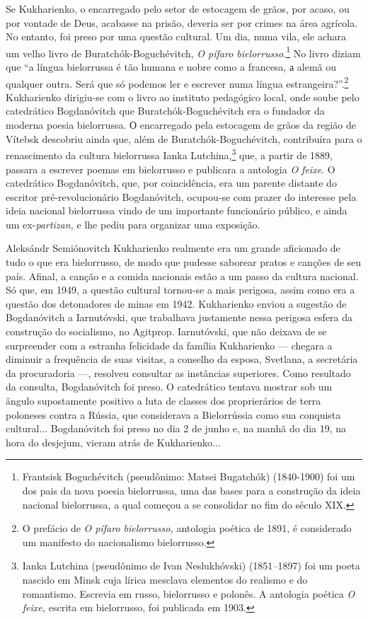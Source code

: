 Se Kukharienko, o encarregado pelo setor de estocagem de grãos, por
acaso, ou por vontade de Deus, acabasse na prisão, deveria ser por
crimes na área agrícola. No entanto, foi preso por uma questão cultural.
Um dia, numa vila, ele achara um velho livro de Buratchók-Boguchévitch,
\emph{O pífaro bielorrusso}.\footnote{Frantsisk Boguchévitch
  (pseudônimo: Matsei Bugatchók) (1840-1900) foi um dos pais da nova
  poesia bielorrussa, uma das bases para a construção da ideia nacional
  bielorrussa, a qual começou a se consolidar no fim do século XIX.} No
livro diziam que ``a língua bielorrussa é tão humana e nobre como a
francesa, а alemã ou qualquer outra. Será que só podemos ler e escrever
numa língua estrangeira?''.\footnote{O prefácio de \emph{O pífaro
  bielorrusso,} antologia poética de 1891, é considerado um manifesto do
  nacionalismo bielorrusso.} Kukharienko dirigiu-se com o livro ao
instituto pedagógico local, onde soube pelo catedrático Bogdanóvitch que
Buratchók-Boguchévitch era o fundador da moderna poesia bielorrussa. О
encarregado pela estocagem de grãos da região de Vítebsk descobriu ainda
que, além de Buratchók-Boguchévitch, contribuíra para o renascimento da
cultura bielorrussa Ianka Lutchina,\footnote{Ianka Lutchina (pseudônimo
  de Ivan Neslukhóvski) (1851\emph{--}1897) foi um poeta nascido em
  Minsk cuja lírica mesclava elementos do realismo e do romantismo.
  Escrevia em russo, bielorrusso e polonês. A antologia poética \emph{O
  feixe,} escrita em bielorrusso, foi publicada em 1903.} que, a partir
de 1889, passara a escrever poemas em bielorrusso e publicara a
antologia \emph{O feixe}. O catedrático Bogdanóvitch, que, por
coincidência, era um parente distante do escritor pré-revolucionário
Bogdanóvitch, ocupou-se com prazer do interesse pela ideia nacional
bielorrussa vindo de um importante funcionário público, e ainda um
ex-\emph{partizan,} e lhe pediu para organizar uma exposição.

Aleksándr Semiónovitch Kukharienko realmente era um grande aficionado de
tudo o que era bielorrusso, de modo que pudesse saborear pratos e
canções de seu país. Afinal, a canção e a comida nacionais estão a um
passo da cultura nacional. Só que, em 1949, a questão cultural tornou-se
a mais perigosa, assim como era a questão dos detonadores de minas em
1942. Kukharienko enviou a sugestão de Bogdanóvitch a Iarnutóvski, que
trabalhava justamente nessa perigosa esfera da construção do socialismo,
no Agitprop. Iarnutóvski, que não deixava de se surpreender com a
estranha felicidade da família Kukharienko --- chegara a diminuir a
frequência de suas visitas, a conselho da esposa, Svetlana, a secretária
da procuradoria ---, resolveu consultar as instâncias superiores. Como
resultado da consulta, Bogdanóvitch foi preso. O catedrático tentava
mostrar sob um ângulo supostamente positivo a luta de classes dos
proprierários de terra poloneses contra a Rússia, que considerava a
Bielorrússia como sua conquista cultural... Bogdanóvitch foi preso no
dia 2 de junho e, na manhã do dia 19, na hora do desjejum, vieram atrás
de Kukharienko...

